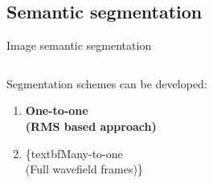 \documentclass[10pt,aspectratio=169,dvipsnames]{beamer} %
\begin{document}
	\subsection{Semantic segmentation}
	\begin{frame}{Image semantic segmentation}
		\begin{columns}[T]
			\begin{column}[c]{0.35\textwidth}
				\medskip
				Segmentation schemes can be developed:
				\medskip
				\begin{enumerate}
					\item \alert{\textbf{One-to-one \\(RMS based approach)}} 
					\medskip
					\item \alert\{textbf{Many-to-one \\(Full wavefield frames)}\}
				\end{enumerate}
			\end{column}
			\begin{column}[c]{0.62\textwidth}
				\begin{figure}
					\qquad
					\qquad
					\qquad
				\end{figure}
			\end{column}
		\end{columns}
	\end{frame}
	
\end{document}
